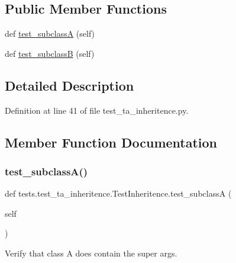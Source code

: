 \subsection*{Public Member Functions}
\begin{DoxyCompactItemize}
\item 
def \hyperlink{classtests_1_1test__ta__inheritence_1_1TestInheritence_acf9dc743befc9912294b89b31f393846}{test\+\_\+subclassA} (self)
\item 
def \hyperlink{classtests_1_1test__ta__inheritence_1_1TestInheritence_a3bed049c4393b8c6c8a9afbe550f7893}{test\+\_\+subclassB} (self)
\end{DoxyCompactItemize}


\subsection{Detailed Description}


Definition at line 41 of file test\+\_\+ta\+\_\+inheritence.\+py.



\subsection{Member Function Documentation}
\mbox{\label{classtests_1_1test__ta__inheritence_1_1TestInheritence_acf9dc743befc9912294b89b31f393846}} 
\subsubsection{\texorpdfstring{test\+\_\+subclass\+A()}{test\_subclassA()}}
{\footnotesize\ttfamily def tests.\+test\+\_\+ta\+\_\+inheritence.\+Test\+Inheritence.\+test\+\_\+subclassA (\begin{DoxyParamCaption}\item[{}]{self }\end{DoxyParamCaption})}

\begin{DoxyVerb}Verify that class A does contain the super args.
\end{DoxyVerb}
 

